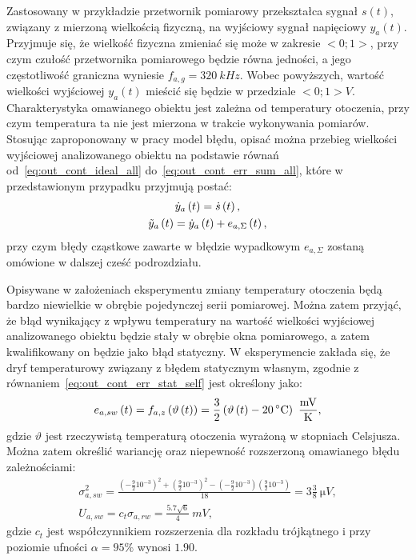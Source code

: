 Zastosowany w przykładzie przetwornik pomiarowy przekształca sygnał $s(t)$, związany z mierzoną wielkością fizyczną, na wyjściowy sygnał napięciowy $y_{a}(t)$. Przyjmuje się, że wielkość fizyczna zmieniać się może w zakresie $<0;1>$, przy czym czułość przetwornika pomiarowego będzie równa jedności, a jego częstotliwość graniczna wyniesie $f_{a,g} = \qty{320}{kHz}$. Wobec powyższych, wartość wielkości wyjściowej $y_{a}(t)$ mieścić się będzie w przedziale $<0;1>\unit{V}$. Charakterystyka omawianego obiektu jest zależna od temperatury otoczenia, przy czym temperatura ta nie jest mierzona w trakcie wykonywania pomiarów. Stosując zaproponowany w pracy model błędu, opisać można przebieg wielkości wyjściowej analizowanego obiektu na podstawie równań od~\eqref{eq:out_cont_ideal_all} do~\eqref{eq:out_cont_err_sum_all}, które w przedstawionym przypadku przyjmują postać:
\begin{gather}
\dot{y}_{a} \left(t\right) = \dot{s} \left(t\right) \label{eq:sym_parta_out_ideal}, \\
\tilde{y}_{a} \left(t\right) = \dot{y}_{a} \left(t\right) + e_{a,\Sigma} \left(t\right) \label{eq:sym_parta_out_real},
\end{gather}
przy czym błędy cząstkowe zawarte w błędzie wypadkowym $e_{a,\Sigma}$ zostaną omówione w dalszej cześć podrozdziału.

Opisywane w założeniach eksperymentu zmiany temperatury otoczenia będą bardzo niewielkie w obrębie pojedynczej serii pomiarowej. Można zatem przyjąć, że błąd wynikający z wpływu temperatury na wartość wielkości wyjściowej analizowanego obiektu będzie stały w obrębie okna pomiarowego, a zatem kwalifikowany on będzie jako błąd statyczny. W eksperymencie zakłada się, że dryf temperaturowy związany z błędem statycznym własnym, zgodnie z równaniem~\eqref{eq:out_cont_err_stat_self} jest określony jako:
\begin{equation}
e_{a,sw} \emb{t} = f_{a,z} \left( \vartheta \emb{t} \right) = \frac{3}{2} \left( \vartheta \emb{t} - \qty{20}{\degreeCelsius} \right)~\unit{\frac{mV}{K}} \label{eq:sym_parta_stat_err},
\end{equation}
gdzie $\vartheta$ jest rzeczywistą temperaturą otoczenia wyrażoną w stopniach Celsjusza. Można zatem określić wariancję oraz niepewność rozszerzoną omawianego błędu zależnościami:
\begin{gather}
\sigma_{a,sw}^{2} = \frac{\left( -\frac{9}{2} 10^{-3} \right)^{2} + \left( \frac{9}{2} 10^{-3} \right)^{2} - \left( -\frac{9}{2} 10^{-3} \right) \left( \frac{9}{2} 10^{-3} \right)}{18} = 3 \frac{3}{8}~\unit{\micro V} \label{eq:sym_parta_stat_var}, \\
U_{a,sw} = c_{t} \sigma_{a,rw} = \frac{5.7 \sqrt{6}}{4}~\unit{mV} \label{eq:sym_parta_stat_unc},
\end{gather}
gdzie $c_{t}$ jest współczynnikiem rozszerzenia dla rozkładu trójkątnego i przy poziomie ufności $\alpha = 95\%$ wynosi $1.90$.

